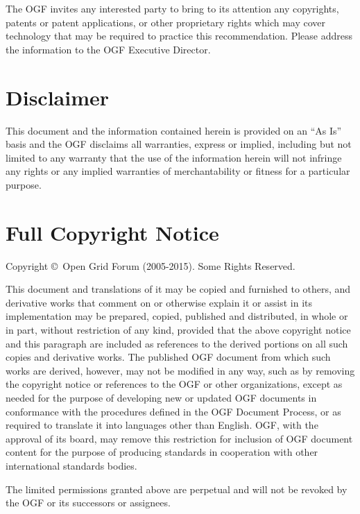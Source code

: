 \documentclass{article}
\newcommand{\copyrightyears}{2005-2015}
\begin{document}
 The OGF invites any interested party to bring to its attention any
 copyrights, patents or patent applications, or other proprietary
 rights which may cover technology that may be required to practice
 this recommendation.  Please address the information to the OGF
 Executive Director.


\section{Disclaimer}

 This document and the information contained herein is provided on an
 ``As Is'' basis and the OGF disclaims all warranties, express or
 implied, including but not limited to any warranty that the use of
 the information herein will not infringe any rights or any implied
 warranties of merchantability or fitness for a particular purpose.


\section{Full Copyright Notice}

 Copyright \copyright \ Open Grid Forum (\copyrightyears). Some Rights
 Reserved.

 This document and translations of it may be copied and furnished to
 others, and derivative works that comment on or otherwise explain it
 or assist in its implementation may be prepared, copied, published
 and distributed, in whole or in part, without restriction of any
 kind, provided that the above copyright notice and this paragraph are
 included as references to the derived portions on all such copies and
 derivative works. The published OGF document from which such works
 are derived, however, may not be modified in any way, such as by
 removing the copyright notice or references to the OGF or other
 organizations, except as needed for the purpose of developing new or
 updated OGF documents in conformance with the procedures defined in
 the OGF Document Process, or as required to translate it into
 languages other than English. OGF, with the approval of its board,
 may remove this restriction for inclusion of OGF document content for
 the purpose of producing standards in cooperation with other
 international standards bodies.

 The limited permissions granted above are perpetual and will not be
 revoked by the OGF or its successors or assignees.

\end{document}
